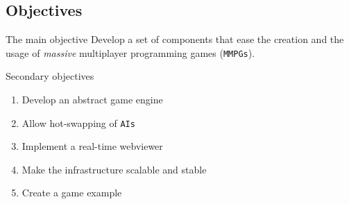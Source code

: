 \documentclass{beamer}
\begin{document}
\subsection{Objectives}
\begin{frame}{The main objective}
Develop a set of components that ease the creation and the usage of \emph{massive} multiplayer programming games (\texttt{MMPGs}).
\end{frame}
\begin{frame}{Secondary objectives}
\begin{enumerate}
\item
Develop an abstract game engine
\item
Allow hot-swapping of \texttt{AIs}
\item
Implement a real-time webviewer
\item
Make the infrastructure scalable and stable
\item
Create a game example
\end{enumerate}
\end{frame}
\end{document}
